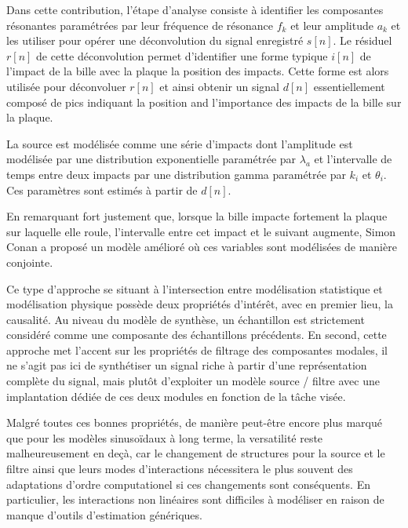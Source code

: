 Dans cette contribution, l'étape d'analyse consiste à identifier les composantes résonantes paramétrées par leur fréquence de résonance $f_k$ et leur amplitude $a_k$ et les utiliser pour opérer une déconvolution du signal enregistré $s[n]$. Le résiduel $r[n]$ de cette déconvolution  permet d'identifier une forme typique $i[n]$ de l'impact de la bille avec la plaque la position des impacts. Cette forme est alors utilisée pour déconvoluer $r[n]$ et ainsi obtenir un signal $d[n]$ essentiellement composé de pics indiquant la position and l'importance des impacts de la bille sur la plaque.

La source est modélisée comme une série d'impacts dont l'amplitude est modélisée par une distribution exponentielle paramétrée par $\lambda_a$  et l'intervalle de temps entre deux impacts par une distribution gamma paramétrée par $k_i$ et $\theta_i$. Ces paramètres sont estimés à partir de $d[n]$.

En remarquant fort justement que, lorsque la bille impacte fortement la plaque sur laquelle elle roule, l'intervalle entre cet impact et le suivant augmente, Simon Conan a proposé un modèle amélioré où ces variables sont modélisées de manière conjointe.~\cite{conan2014synthesis}

Ce type d'approche se situant à l'intersection entre modélisation statistique et modélisation physique possède deux propriétés d'intérêt, avec en premier lieu, la causalité. Au niveau du modèle de synthèse, un échantillon est strictement considéré comme une composante des échantillons précédents. En second, cette approche met l'accent sur les propriétés de filtrage des composantes modales, il ne s'agit pas ici de synthétiser un signal riche à partir d'une représentation complète du signal, mais plutôt d'exploiter un modèle source / filtre avec une implantation dédiée de ces deux modules en fonction de la tâche visée.


Malgré toutes ces bonnes propriétés, de manière peut-être encore plus marqué que pour les modèles sinusoïdaux à long terme, la versatilité reste malheureusement en deçà, car le changement de structures pour la source et le filtre ainsi que leurs modes d'interactions nécessitera le plus souvent des adaptations d'ordre computationel si ces changements sont conséquents. En particulier, les interactions non linéaires sont difficiles à modéliser en raison de manque d'outils d'estimation génériques.

